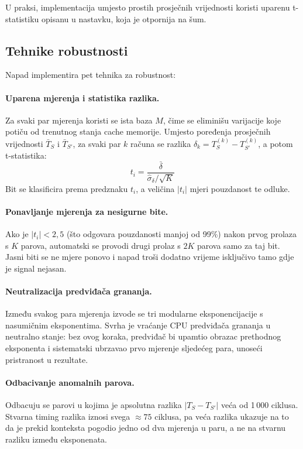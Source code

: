 U praksi, implementacija umjesto prostih prosječnih vrijednosti koristi uparenu t-statistiku opisanu u nastavku, koja je otpornija na šum.

\subsection{Tehnike robustnosti}

Napad implementira pet tehnika za robustnost:

\paragraph{Uparena mjerenja i statistika razlika.}
Za svaki par mjerenja koristi se ista baza $M$, čime se eliminišu varijacije koje potiču od trenutnog stanja cache memorije. Umjesto poređenja prosječnih vrijednosti $\bar{T}_S$ i $\bar{T}_{S'}$, za svaki par $k$ računa se razlika $\delta_k = T_S^{(k)} - T_{S'}^{(k)}$, a potom t-statistika:
\[
t_i = \frac{\bar{\delta}}{\hat{\sigma}_\delta / \sqrt{K}}
\]
Bit se klasificira prema predznaku $t_i$, a veličina $|t_i|$ mjeri pouzdanost te odluke.

\paragraph{Ponavljanje mjerenja za nesigurne bite.}
Ako je $|t_i| < 2{,}5$ (što odgovara pouzdanosti manjoj od 99\%) nakon prvog prolaza s $K$ parova, automatski se provodi drugi prolaz s $2K$ parova samo za taj bit. Jasni biti se ne mjere ponovo i napad troši dodatno vrijeme isključivo tamo gdje je signal nejasan.

\paragraph{Neutralizacija predviđača grananja.}
Između svakog para mjerenja izvode se tri modularne eksponencijacije s nasumičnim eksponentima. Svrha je vraćanje CPU predviđača grananja u neutralno stanje: bez ovog koraka, predviđač bi upamtio obrazac prethodnog eksponenta i sistematski ubrzavao prvo mjerenje sljedećeg para, unoseći pristranost u rezultate.

\paragraph{Odbacivanje anomalnih parova.}
Odbacuju se parovi u kojima je apsolutna razlika $|T_S - T_{S'}|$ veća od 1\,000 ciklusa. Stvarna timing razlika iznosi svega $\approx 75$ ciklusa, pa veća razlika ukazuje na to da je prekid konteksta pogodio jedno od dva mjerenja u paru, a ne na stvarnu razliku između eksponenata.

